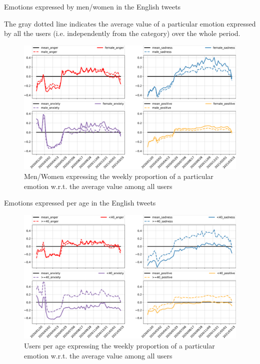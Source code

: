 \documentclass[9pt,aspectratio=1610]{beamer}  %
\begin{document}
\begin{frame}{Emotions expressed by men/women in the English tweets}

    The gray dotted line indicates the average value of a particular emotion expressed by all the users (i.e. independently from the category) over the whole period.

    \begin{figure}[H]
	    \centering
    	\includegraphics[scale=.27]{assets/img/en_4_categories_per_gender_over_mean_subplot.svg.pdf}
    	\caption{Men/Women expressing the weekly proportion of a particular emotion w.r.t. the average value among all users}
    	\label{fig:en-4-categories-per-gender-over-mean}
    \end{figure}
    
\end{frame}

\begin{frame}{Emotions expressed per age in the English tweets}

    \begin{figure}[H]
	    \centering
    	\includegraphics[scale=.30]{assets/img/en_4_categories_per_age_over_mean_subplot.svg.pdf}
    	\caption{Users per age expressing the weekly proportion of a particular emotion w.r.t. the average value among all users}
    	\label{fig:en-4-categories-per-age-over-mean}
    \end{figure}
    
\end{frame}
\end{document}

